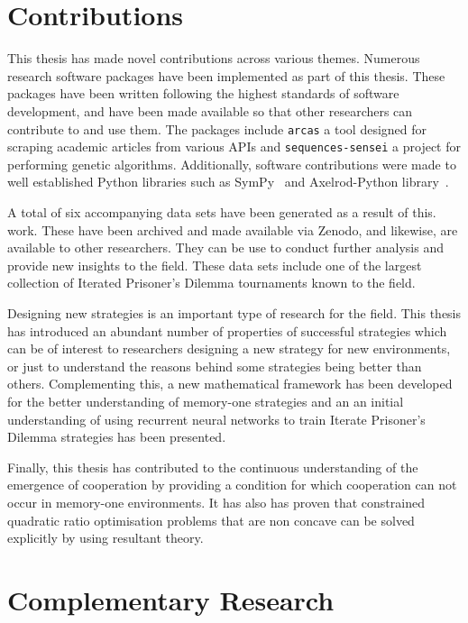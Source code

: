 \section{Contributions}

This thesis has made novel contributions across various themes. Numerous
research software packages have been implemented as part of this thesis. These
packages have been written following the highest standards of software
development, and have been made available so that other researchers can
contribute to and use them. The packages include \texttt{arcas} a tool designed for
scraping academic articles from various APIs and
\texttt{sequences-sensei} a project for performing genetic
algorithms. Additionally, software contributions were made to well established
Python libraries such as SymPy~\cite{sympy} and Axelrod-Python
library~\cite{axelrodproject}.

A total of six accompanying data sets have been generated as a result of this. %
work. These have been archived and made available via Zenodo, and likewise, are
available to other researchers. They can be use to conduct further analysis and
provide new insights to the field. These data sets include one of the largest
collection of Iterated Prisoner's Dilemma tournaments known to the field.

Designing new strategies is an important type of research for the field.
This thesis has introduced an abundant number of properties of successful
strategies which can be of interest to researchers designing a new strategy
for new environments, or just to understand the reasons behind some strategies
being better than others. Complementing this, a new mathematical framework has
been developed for the better understanding of memory-one strategies and an
an initial understanding of using recurrent neural networks to train Iterate Prisoner's
Dilemma strategies has been presented.

Finally, this thesis has contributed to the continuous understanding of the emergence of
cooperation by providing a condition for which cooperation can not occur in
memory-one environments. It has also has proven that constrained quadratic
ratio optimisation problems that are non concave can be solved explicitly by
using resultant theory.

\section{Complementary Research}


